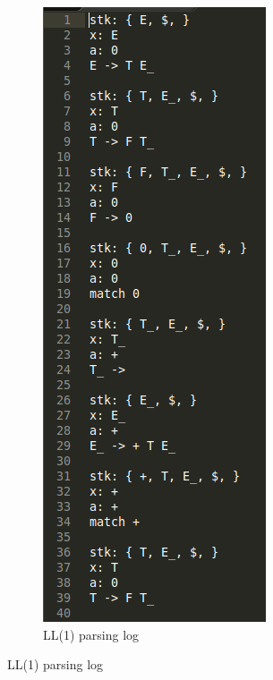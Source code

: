 \documentclass{beamer}
\begin{document}
\begin{frame}
\begin{figure}
\begin{subfigure}[b]{0.3\textwidth}
        \includegraphics[height=0.8\textheight]{LogLL1.png}
        \caption{LL(1) parsing log}
        \label{fig:ll1}
    \end{subfigure}
\end{figure}
 \end{frame}
\end{document}
